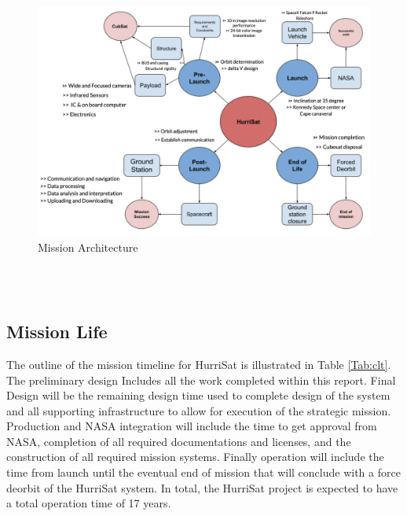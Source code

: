 \begin{figure}[hbt!]
    \centering
    \includegraphics[width=\textwidth, frame,scale=0.9, keepaspectratio]{Images/march.png}
    \caption{Mission Architecture}
    \label{fig:march}
\end{figure}\\\\

\subsection{Mission Life}
The outline of the mission timeline for HurriSat is illustrated in Table \ref{Tab:clt}. The preliminary design Includes all the work completed within this report. Final Design will be the remaining design time used to complete design of the system and all supporting infrastructure to allow for execution of the strategic mission. Production and NASA integration will include the time to get approval from NASA, completion of all required documentations and licenses, and the construction of all required mission systems. Finally operation will include the time from launch until the eventual end of mission that will conclude with a force deorbit of the HurriSat system. In total, the HurriSat project is expected to have a total operation time of 17 years.

